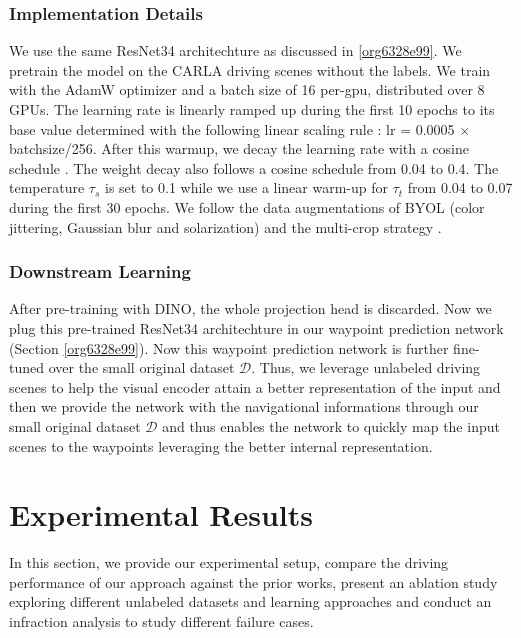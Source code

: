 \documentclass[letterpaper, 12pt]{book}
\theoremstyle{definition}
\theoremstyle{definition}
\theoremstyle{definition}
\theoremstyle{definition}
\theoremstyle{definition}
\begin{document}
\subsubsection{Implementation Details}
\label{sec:org9a9d5ac}
We use the same ResNet34 architechture as discussed in \ref{org6328e99}. We pretrain the
model on the CARLA driving scenes without the labels. We train with the AdamW
optimizer \cite{Loshchilov2017} and a batch size of 16 per-gpu, distributed over
8 GPUs. The learning rate is linearly ramped up during the first 10 epochs to
its base value determined with the following linear scaling rule
\cite{Goyal2017}: lr = 0.0005 \(\times\) batchsize/256. After this warmup, we decay the
learning rate with a cosine schedule \cite{Loshchilov2016}. The weight decay
also follows a cosine schedule from 0.04 to 0.4. The temperature \(\tau_{s}\) is
set to 0.1 while we use a linear warm-up for \(\tau_{t}\) from 0.04 to 0.07 during
the first 30 epochs. We follow the data augmentations of BYOL \cite{Grill2020}
(color jittering, Gaussian blur and solarization) and the multi-crop strategy
\cite{Caron2020}. 

\subsubsection{Downstream Learning}
\label{sec:org93ba91d}
After pre-training with DINO, the whole projection head is discarded.  Now we
plug this pre-trained ResNet34 architechture in our waypoint prediction network
(Section \ref{org6328e99}). Now this waypoint prediction network is further fine-tuned over
the small original dataset \(\mathcal{D}\). Thus, we leverage unlabeled driving scenes
to help the visual encoder attain a better representation of the input and then
we provide the network with the navigational informations through our small
original dataset \(\mathcal{D}\) and thus enables the network to quickly map the input
scenes to the waypoints leveraging the better internal representation. 

\section{Experimental Results \label{orgb8662bc}}
\label{sec:org5f9f6a1}

In this section, we provide our experimental setup, compare the driving
performance of our approach against the prior works, present an ablation study
exploring different unlabeled datasets and learning approaches and conduct an
infraction analysis to study different failure cases.
\end{document}
